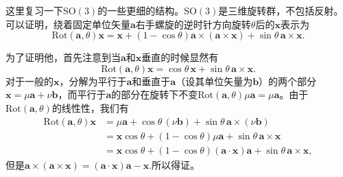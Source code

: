这里复习一下$\mathrm{SO}(3)$的一些更细的结构。$\mathrm{SO}(3)$是三维旋转群，不包括反射。可以证明，绕着固定单位矢量$\bm{a}$右手螺旋的逆时针方向旋转$\theta$后的$\bm{x}$表示为
\[
\mathrm{Rot}(\bm{a},\theta)\bm{x}=\bm{x}+(1-\cos\theta)\bm{a}\times(\bm{a}\times\bm{x})+
\sin\theta\,\bm{a}\times\bm{x}.
\]

为了证明他，首先注意到当$\bm{a}$和$\bm{x}$垂直的时候显然有
\[
\mathrm{Rot}(\bm{a},\theta)\bm{x}=\cos\theta\,\bm{x}+
\sin\theta\,\bm{a}\times\bm{x}.
\]
对于一般的$\bm{x}$，分解为平行于$\bm{a}$和垂直于$\bm{a}$（设其单位矢量为$\bm{b}$）的两个部分$\bm{x}=\mu\bm{a}+\nu\bm{b}$，而平行于$\bm{a}$的部分在旋转下不变$\mathrm{Rot}(\bm{a},\theta)\mu\bm{a}=\mu\bm{a}$。由于$\mathrm{Rot}(\bm{a},\theta)$的线性性，我们有
\[
\begin{split}
\mathrm{Rot}(\bm{a},\theta)\bm{x}&=\mu\bm{a}+\cos\theta\,(\nu\bm{b})+
\sin\theta\,\bm{a}\times(\nu\bm{b})\\
&=\bm{x}\cos\theta+(1-\cos\theta)\mu\bm{a}+
\sin\theta\,\bm{a}\times\bm{x}\\
&=\bm{x}\cos\theta+(1-\cos\theta)(\bm{a}\cdot\bm{x})\bm{a}+
\sin\theta\,\bm{a}\times \bm{x},
\end{split}
\]
但是$\bm{a}\times(\bm{a}\times\bm{x})=(\bm{a}\cdot\bm{x})\bm{a}-\bm{x}$.所以得证。

